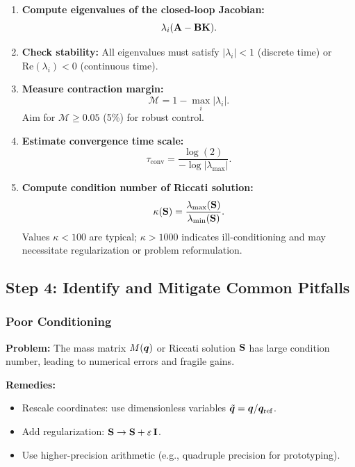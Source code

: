\begin{enumerate}
\item \textbf{Compute eigenvalues of the closed-loop Jacobian:}
\begin{equation}
\lambda_i(\mathbf{A} - \mathbf{B}\mathbf{K}).
\end{equation}

\item \textbf{Check stability:} All eigenvalues must satisfy $|\lambda_i| < 1$ (discrete time) or
$\text{Re}(\lambda_i) < 0$ (continuous time).

\item \textbf{Measure contraction margin:}
\begin{equation}
\mathcal{M} = 1 - \max_i |\lambda_i|.
\end{equation}
Aim for $\mathcal{M} \ge 0.05$ (5\%) for robust control.

\item \textbf{Estimate convergence time scale:}
\begin{equation}
\tau_{\text{conv}} = \frac{\log(2)}{-\log|\lambda_{\max}|}.
\end{equation}

\item \textbf{Compute condition number of Riccati solution:}
\begin{equation}
\kappa(\mathbf{S}) = \frac{\lambda_{\max}(\mathbf{S})}{\lambda_{\min}(\mathbf{S})}.
\end{equation}
Values $\kappa < 100$ are typical; $\kappa > 1000$ indicates ill-conditioning and may
necessitate regularization or problem reformulation.
\end{enumerate}

\subsection{Step 4: Identify and Mitigate Common Pitfalls}

\subsubsection{Poor Conditioning}

\textbf{Problem:} The mass matrix $M(\bm{q})$ or Riccati solution $\mathbf{S}$ has large condition number,
leading to numerical errors and fragile gains.

\textbf{Remedies:}
\begin{itemize}
\item Rescale coordinates: use dimensionless variables $\tilde{\bm{q}} = \bm{q}/\bm{q}_{\text{ref}}$.
\item Add regularization: $\mathbf{S} \to \mathbf{S} + \varepsilon\,\mathbf{I}$.
\item Use higher-precision arithmetic (e.g., quadruple precision for prototyping).
\end{itemize}

